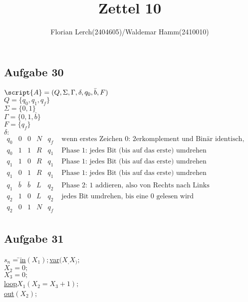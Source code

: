 \documentclass[11pt]{amsart}
\title{Zettel 10}
\author{Florian Lerch(2404605)/Waldemar Hamm(2410010)}
\begin{document}

\maketitle

\subsection*{Aufgabe 30}

$\script{A} = (Q, \Sigma, \Gamma, \delta, q_0, \bar{b}, F)$ \\
$Q = \{q_0, q_1, q_f \}$ \\
$\Sigma = \{0, 1\}$ \\
$\Gamma = \{0, 1, \bar{b} \}$ \\
$F = \{q_f\}$ \\
$\delta:$ \\
$\begin{array}{cccccc}
q_0 & 0 & 0 & N & q_f & \mbox{ wenn erstes Zeichen 0: 2erkomplement und Binär identisch, also fertig } \\
q_0 & 1 & 1 & R & q_1 & \mbox{ Phase 1: jedes Bit (bis auf das erste) umdrehen } \\
q_1 & 1 & 0 & R & q_1 & \mbox{ Phase 1: jedes Bit (bis auf das erste) umdrehen } \\
q_1 & 0 & 1 & R & q_1 & \mbox{ Phase 1: jedes Bit (bis auf das erste) umdrehen } \\
q_1 & \bar{b} & \bar{b} & L & q_2 & \mbox{ Phase 2: 1 addieren, also von Rechts nach Links } \\
q_2 & 1 & 0 & L & q_2 & \mbox{ jedes Bit umdrehen, bis eine 0 gelesen wird } \\
q_2 & 0 & 1 & N & q_f & \\ 
\end{array}$

\subsection*{Aufgabe 31}

\begin{tabbing}
  $s_n = $\=$ $\underline{in}$ (X_1); $\underline{var}$(X_,X_);$ \\
  \>$ X_2 = 0;$ \\
  \>$ X_3 = 0;$ \\
  \>$ $\underline{loop}$ X_1(X_2 = X_3 + 1);$ \\
  \>$ $\underline{out}$ (X_2);$
\end{tabbing}
  
\end{document}
